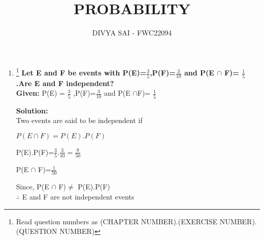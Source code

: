\documentclass{article}
\begin{document}
\title{PROBABILITY}
\author{\Large DIVYA SAI - FWC22094}
\date{}

\maketitle
\begin{enumerate}[label=13.\arabic{enumi}.\arabic{enumii}]%
\setcounter{enumi}{1}
\setcounter{enumii}{6}

\item \footnote{Read question numbers as (CHAPTER NUMBER).(EXERCISE NUMBER).(QUESTION NUMBER)}\textbf { Let E and F be events with P(E)=$\frac{3}{5}$,P(F)=$\frac{3}{10}$ and P(E $\cap $ F)= $\frac{1}{5}$.Are E and F independent?}\\[1ex]

\noindent \textbf{Given:} 
P(E) = $\frac{3}{5}$ ,P(F)=$\frac{3}{10}$  and P(E $\cap $F)= $\frac{1}{5}$

\textbf{Solution:}
\\
Two events are said to be independent if\\
\begin{center}
$P(E \cap F) =P(E).P(F)$ 
\end{center}
\begin{center}
P(E).P(F)=$\frac{3}{5}.\frac{3}{10}=\frac{9}{50}$
\end{center}
\begin{center}
P(E $\cap $ F)=$\frac{1}{50}$
\end{center}
\begin{center}
Since, P(E $\cap $ F)$\neq$ P(E).P(F)\\
$\therefore$ E and F are not independent events
\end{center}
\vspace{10mm}
\end{enumerate}
\end{document}
